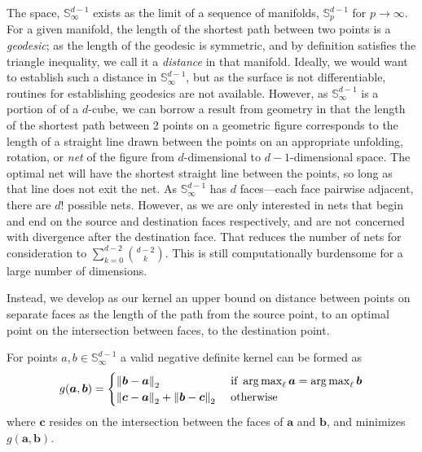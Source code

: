 The space, ${\mathbb S}_{\infty}^{d-1}$ exists as the limit of a sequence of manifolds, ${\mathbb S}_p^{d-1}$ for $p\to\infty$.  For a given manifold, the length of the shortest path between two points is a \emph{geodesic}; as the length of the geodesic is symmetric, and by definition satisfies the triangle inequality, we call it a \emph{distance} in that manifold.  Ideally, we would want to establish such a distance in ${\mathbb S}_{\infty}^{d-1}$, but as the surface is not differentiable, routines for establishing geodesics are not available.  However, as ${\mathbb S}_{\infty}^{d-1}$ is a portion of of a $d$-cube, we can borrow a result from geometry \citep{pappas1989} in that the length of the shortest path between 2 points on a geometric figure corresponds to the length of a straight line drawn between the points on an appropriate unfolding, rotation, or \emph{net} of the figure from $d$-dimensional to $d-1$-dimensional space.  The optimal net will have the shortest straight line between the points, so long as that line does not exit the net. As ${\mathbb S}_{\infty}^{d-1}$ has $d$ faces---each face pairwise adjacent, there are $d!$ possible nets.  However, as we are only interested in nets that begin and end on the source and destination faces respectively, and are not concerned with divergence after the destination face.  That reduces the number of nets for consideration to $\sum_{k = 0}^{d-2}\binom{d-2}{k}$.  This is still computationally burdensome for a large number of dimensions.  

Instead, we develop as our kernel an upper bound on distance between points on separate faces as the length of the path from the source point, to an optimal point on the intersection between faces, to the destination point.
\begin{prop}
For points $a,b \in {\mathbb S}_{\infty}^{d-1}$ a valid negative definite kernel can be formed as
  \begin{equation}
    g(\bm{a},\bm{b}) = \begin{cases}
        \pnorm{\bm{b}-\bm{a}}{2} &\text{ if }\argmax_{\ell}\bm{a} = \argmax_{\ell}\bm{b}\\
        \pnorm{\bm{c}-\bm{a}}{2} + \pnorm{\bm{b}-\bm{c}}{2} &\text{ otherwise}
    \end{cases}
  \end{equation}
  where $\bm{c}$ resides on the intersection between the faces of $\bm{a}$ and $\bm{b}$, and minimizes $g(\bm{a},\bm{b})$.
\end{prop}

